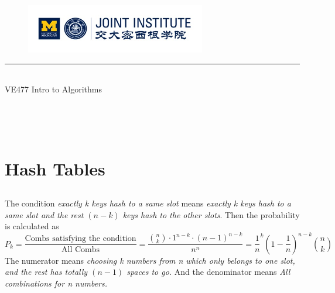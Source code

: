 \documentclass{article}
\begin{document}
\setmainfont{Cormorant Upright}
\renewcommand\arraystretch{1.5}


\thispagestyle{empty}

\begin{center}
\begin{large}
\begin{figure}[!htbp]
\centering
\includegraphics[width=0.7\textwidth]{Logo2.png}
\end{figure}
\hrule
\vspace*{0.25cm}
 \\ 
VE477 Intro to Algorithms\\
\end{large}
\hrulefill

\vspace*{3cm}

\begin{Large}
 \\
\end{Large}
\vspace*{2cm}
\begin{large}
 \\
\end{large}
\end{center}
\newpage
\setmainfont{Optima}
\setmonofont{Optima}
\setsansfont{Optima}
\setcounter{page}{1}
\section{Hash Tables}
\subsection{}
The condition \textit{exactly k keys hash to a same slot} means \textit{exactly k keys hash to a same slot and the rest $(n-k)$ keys hash to the other slots}.
Then the probability is calculated as \[
	P_k = \frac{\text{Combs satisfying the condition}}{\text{All Combs}} = \frac{\binom{n}{k}\cdot 1^{n-k	}\cdot (n-1)^{n-k}}{n^n} = \frac{1}{n}^k \left(1- \frac{1}{n} \right)^{n-k} \binom{n}{k}
\]	
The numerator means \textit{choosing k numbers from n which only belongs to one slot, and the rest has totally $(n-1)$ spaces to go.} And the denominator means \textit{All combinations for n numbers.}
\end{document}
